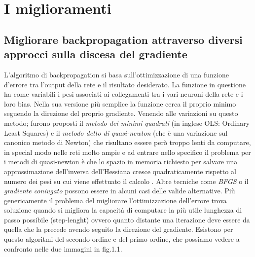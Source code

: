 \section*{I miglioramenti}
\subsection*{Migliorare backpropagation attraverso diversi approcci sulla discesa del gradiente}

L'algoritmo di backpropagation si basa sull'ottimizzazione di una funzione d'errore tra l'output della rete e il risultato desiderato. La funzione in questione ha come variabili i pesi associati ai collegamenti tra i vari neuroni della rete e i loro bias. Nella sua versione più semplice la funzione cerca il proprio minimo seguendo la direzione del proprio gradiente.
Venendo alle variazioni su questo metodo; furono proposti il \textit{metodo dei minimi quadrati} (in inglese OLS: Ordinary Least Squares) e il \textit{metodo detto di quasi-newton} (che è una variazione sul canonico metodo di Newton) che risultano essere però troppo lenti da computare, in special modo nelle reti molto ampie e ad entrare nello specifico il problema per i metodi di quasi-newton è che lo spazio in memoria richiesto per salvare una approssimazione dell'inversa dell'Hessiana cresce quadraticamente rispetto al numero dei pesi su cui viene effettuato il calcolo \cite{saito1997partial}. Altre tecniche come \textit{BFGS} o il \textit{gradiente coniugato} possono essere in alcuni casi delle valide alternative.
Più genericamente il problema del migliorare l'ottimizzazione dell'errore trova soluzione quando si migliora la capacità di computare la più utile lunghezza di passo possibile (step-lenght) ovvero quanto distante una iterazione deve essere da quella che la precede avendo seguito la direzione del gradiente.
Esistono per questo algoritmi del secondo ordine e del primo ordine, che possiamo vedere a confronto nelle due immagini in fig.1.1.


